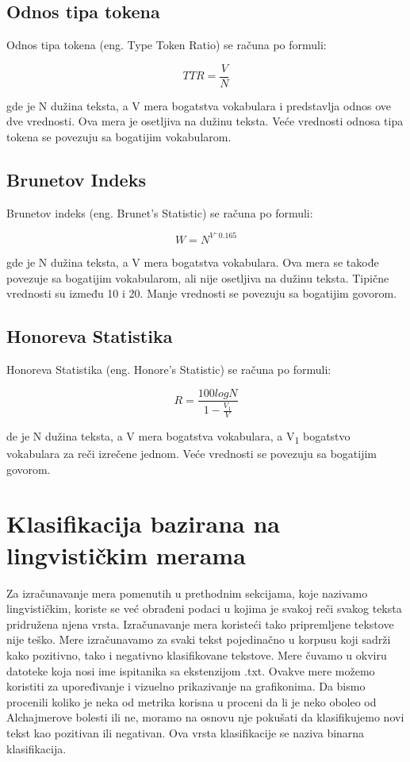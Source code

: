 \documentclass[12pt,oneside]{memoir}
\begin{document}
\subsection{Odnos tipa tokena}

Odnos tipa tokena (eng. Type Token Ratio) se računa po formuli:

\begin{equation}
	TTR = \frac{V}{N}
\end{equation}

gde je N dužina teksta, a V mera bogatstva vokabulara i predstavlja odnos ove dve vrednosti. Ova mera je osetljiva na dužinu teksta.  Veće vrednosti odnosa tipa tokena se povezuju sa bogatijim vokabularom. 

\subsection{Brunetov Indeks}

Brunetov indeks (eng. Brunet's Statistic) se računa po formuli:

\begin{equation}
	W = N^{V^-0.165}
\end{equation}

gde je N dužina teksta, a V mera bogatstva vokabulara. Ova mera se takođe povezuje sa bogatijim vokabularom, ali nije osetljiva na dužinu teksta.  Tipične vrednosti su između 10 i 20.  Manje vrednosti se povezuju sa bogatijim govorom. 

\subsection{Honoreva Statistika}

Honoreva Statistika (eng. Honore's Statistic) se računa po formuli:

\begin{equation}
	R = \frac{100logN}{1 - \frac{V_1}{V}}
\end{equation}

de je N dužina teksta, a V mera bogatstva vokabulara, a V\textsubscript{1} bogatstvo vokabulara za reči izrečene jednom.  Veće vrednosti se povezuju sa bogatijim govorom.  

\section{Klasifikacija bazirana na lingvističkim merama}

Za izračunavanje mera pomenutih u prethodnim sekcijama,  koje nazivamo lingvističkim,  koriste se već obrađeni podaci u kojima je svakoj reči svakog teksta pridružena njena vrsta.  Izračunavanje mera koristeći tako pripremljene tekstove nije teško.  Mere izračunavamo za svaki tekst pojedinačno u korpusu koji sadrži kako pozitivno, tako i negativno klasifikovane tekstove.  Mere čuvamo u okviru datoteke koja nosi ime ispitanika sa ekstenzijom .txt. Ovakve mere možemo koristiti za upoređivanje i vizuelno prikazivanje na grafikonima. Da bismo procenili koliko je neka od metrika korisna u proceni da li je neko oboleo od Alchajmerove bolesti ili ne,  moramo na osnovu nje pokušati da klasifikujemo novi tekst kao pozitivan ili negativan.  Ova vrsta klasifikacije se naziva binarna klasifikacija. 
\end{document}
